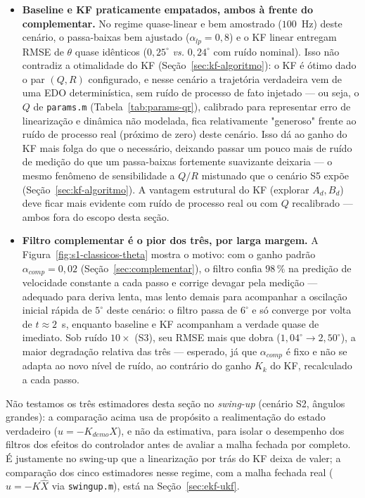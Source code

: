 \documentclass[brazil, 12pt]{article}
\begin{document}
\begin{itemize}
  \item \textbf{Baseline e KF praticamente empatados, ambos à frente do
  complementar.} No regime quase-linear e bem amostrado ($100$~Hz) deste
  cenário, o passa-baixas bem ajustado ($\alpha_{lp}=0{,}8$) e o KF linear
  entregam RMSE de $\theta$ quase idênticos ($0{,}25^{\circ}$ \emph{vs.}
  $0{,}24^{\circ}$ com ruído nominal). Isso não contradiz a otimalidade do KF
  (Seção~\ref{sec:kf-algoritmo}): o KF é ótimo dado o par $(Q,R)$
  configurado, e nesse cenário a trajetória verdadeira vem de uma EDO
  determinística, sem ruído de processo de fato injetado --- ou seja, o $Q$
  de \texttt{params.m} (Tabela~\ref{tab:params-qr}), calibrado para
  representar erro de linearização e dinâmica não modelada, fica relativamente
  "generoso" frente ao ruído de processo real (próximo de zero) deste cenário.
  Isso dá ao ganho do KF mais folga do que o necessário, deixando passar um
  pouco mais de ruído de medição do que um passa-baixas fortemente suavizante
  deixaria --- o mesmo fenômeno de sensibilidade a $Q/R$ mistunado que o
  cenário S5 expõe (Seção~\ref{sec:kf-algoritmo}). A vantagem estrutural do KF
  (explorar $A_d,B_d$) deve ficar mais evidente com ruído de processo real ou
  com $Q$ recalibrado --- ambos fora do escopo desta seção.

  \item \textbf{Filtro complementar é o pior dos três, por larga margem.} A
  Figura~\ref{fig:s1-classicos-theta} mostra o motivo: com o ganho padrão
  $\alpha_{comp}=0{,}02$ (Seção~\ref{sec:complementar}), o filtro confia
  $98\,\%$ na predição de velocidade constante a cada passo e corrige devagar
  pela medição --- adequado para deriva lenta, mas lento demais para
  acompanhar a oscilação inicial rápida de $5^{\circ}$ deste cenário: o filtro
  passa de $6^{\circ}$ e só converge por volta de $t\approx2$~s, enquanto
  baseline e KF acompanham a verdade quase de imediato. Sob ruído $10\times$
  (S3), seu RMSE mais que dobra ($1{,}04^{\circ}\to2{,}50^{\circ}$), a maior
  degradação relativa das três --- esperado, já que $\alpha_{comp}$ é fixo e
  não se adapta ao novo nível de ruído, ao contrário do ganho $K_k$ do KF,
  recalculado a cada passo.
\end{itemize}

Não testamos os três estimadores desta seção no \emph{swing-up} (cenário S2,
ângulos grandes): a comparação acima usa de propósito a realimentação do
estado verdadeiro ($u=-K_{demo}X$), e não da estimativa, para isolar o
desempenho dos filtros dos efeitos do controlador antes de avaliar a malha
fechada por completo. É justamente no swing-up
que a linearização por trás do KF deixa de valer; a comparação dos cinco
estimadores nesse regime, com a malha fechada real ($u=-K\hat X$ via
\texttt{swingup.m}), está na Seção~\ref{sec:ekf-ukf}.
\end{document}
